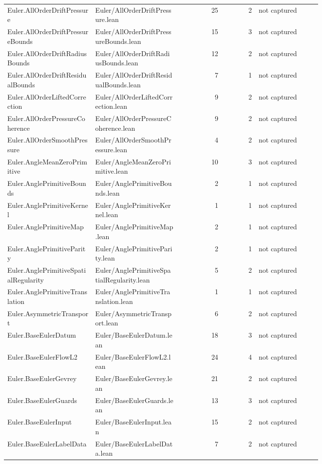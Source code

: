 \documentclass[10pt]{article}
\begin{document}
\begin{longtable}{p{0.28\linewidth}p{0.27\linewidth}r r p{0.20\linewidth}}
Euler.AllOrderDriftPressure & Euler/AllOrderDriftPressure.lean & 25 & 2 & not captured\\
Euler.AllOrderDriftPressureBounds & Euler/AllOrderDriftPressureBounds.lean & 15 & 3 & not captured\\
Euler.AllOrderDriftRadiusBounds & Euler/AllOrderDriftRadiusBounds.lean & 12 & 2 & not captured\\
Euler.AllOrderDriftResidualBounds & Euler/AllOrderDriftResidualBounds.lean & 7 & 1 & not captured\\
Euler.AllOrderLiftedCorrection & Euler/AllOrderLiftedCorrection.lean & 9 & 2 & not captured\\
Euler.AllOrderPressureCoherence & Euler/AllOrderPressureCoherence.lean & 9 & 2 & not captured\\
Euler.AllOrderSmoothPressure & Euler/AllOrderSmoothPressure.lean & 4 & 2 & not captured\\
Euler.AngleMeanZeroPrimitive & Euler/AngleMeanZeroPrimitive.lean & 10 & 3 & not captured\\
Euler.AnglePrimitiveBounds & Euler/AnglePrimitiveBounds.lean & 2 & 1 & not captured\\
Euler.AnglePrimitiveKernel & Euler/AnglePrimitiveKernel.lean & 1 & 1 & not captured\\
Euler.AnglePrimitiveMap & Euler/AnglePrimitiveMap.lean & 2 & 1 & not captured\\
Euler.AnglePrimitiveParity & Euler/AnglePrimitiveParity.lean & 2 & 1 & not captured\\
Euler.AnglePrimitiveSpatialRegularity & Euler/AnglePrimitiveSpatialRegularity.lean & 5 & 2 & not captured\\
Euler.AnglePrimitiveTranslation & Euler/AnglePrimitiveTranslation.lean & 1 & 1 & not captured\\
Euler.AsymmetricTransport & Euler/AsymmetricTransport.lean & 6 & 2 & not captured\\
Euler.BaseEulerDatum & Euler/BaseEulerDatum.lean & 18 & 3 & not captured\\
Euler.BaseEulerFlowL2 & Euler/BaseEulerFlowL2.lean & 24 & 4 & not captured\\
Euler.BaseEulerGevrey & Euler/BaseEulerGevrey.lean & 21 & 2 & not captured\\
Euler.BaseEulerGuards & Euler/BaseEulerGuards.lean & 13 & 3 & not captured\\
Euler.BaseEulerInput & Euler/BaseEulerInput.lean & 15 & 2 & not captured\\
Euler.BaseEulerLabelData & Euler/BaseEulerLabelData.lean & 7 & 2 & not captured\\

\end{longtable}
\end{document}
